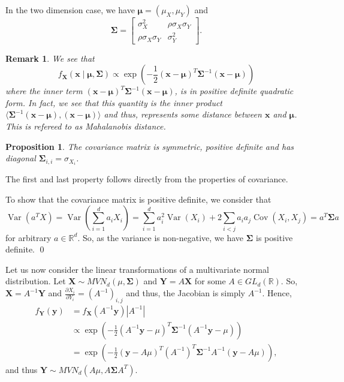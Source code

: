 \documentclass[
]{article}
\newtheorem{prop}{Proposition}[theorem]
\newtheorem*{remark}{Remark}
\theoremstyle{definition}
\begin{document}
In the two dimension case, we have \(\mathbf{\mu} = (\mu_X, \mu_Y)\) and
\[
  \mathbf{\Sigma} = 
  \begin{bmatrix}
    \sigma_X^2 & \rho \sigma_X \sigma_Y \\
    \rho \sigma_X \sigma_Y & \sigma_Y^2
  \end{bmatrix}.
\]

\begin{remark}
  We see that 
  \[
    f_\mathbf{X}(\mathbf{x} \mid \mathbf{\mu}, \mathbf{\Sigma}) \propto 
    \exp\left(-\frac{1}{2}(\mathbf{x} - \mathbf{\mu})^T \mathbf{\Sigma}^{-1}
    (\mathbf{x} - \mathbf{\mu})\right)
  \]
  where the inner term \((\mathbf{x} - \mathbf{\mu})^T \mathbf{\Sigma}^{-1}
  (\mathbf{x} - \mathbf{\mu})\), is in positive definite quadratic form. 
  In fact, we see that this quantity is the inner product 
  \(\langle \mathbf{\Sigma}^{-1} (\mathbf{x} - \mathbf{\mu}), 
  (\mathbf{x} - \mathbf{\mu}) \rangle\) and thus, represents some distance 
  between \(\mathbf{x}\) and \(\mathbf{\mu}\). This is refereed to as 
  Mahalanobis distance.
\end{remark}

\begin{prop}
  The covariance matrix is symmetric, positive definite and has diagonal 
  \(\mathbf{\Sigma}_{i, i} = \sigma_{X_i}\).
\end{prop}
\proof

The first and last property follows directly from the properties of
covariance.

To show that the covariance matrix is positive definite, we consider
that
\[\mathop{\mathrm{Var}}(a^T X) = \mathop{\mathrm{Var}}\left(\sum_{i = 1}^d a_i X_i\right) = 
    \sum_{i = 1}^d a_i^2 \mathop{\mathrm{Var}}(X_i) + 2 \sum_{i < j} a_i a_j \mathop{\mathrm{Cov}}(X_i, X_j)
    = a^T \mathbf{\Sigma}a \] for arbitrary \(a \in \mathbb{R}^d\). So,
as the variance is non-negative, we have \(\mathbf{\Sigma}\) is positive
definite. \qed

Let us now consider the linear transformations of a multivariate normal
distribution. Let \(\mathbf{X} \sim MVN_d(\mu, \mathbf{\Sigma})\) and
\(\mathbf{Y} = A \mathbf{X}\) for some \(A \in GL_d(\mathbb{R})\). So,
\(\mathbf{X} = A^{-1}\mathbf{Y}\) and
\(\frac{\partial{X_i}}{\partial{Y_i}} = (A^{-1})_{i, j}\) and thus, the
Jacobian is simply \(A^{-1}\). Hence, \begin{align*}
  f_\mathbf{Y}(\mathbf{y}) & = f_\mathbf{X}(A^{-1}\mathbf{y})\left|A^{-1}\right|\\
  & \propto \exp\left(-\frac{1}{2}(A^{-1}\mathbf{y} - \mu)^T 
    \mathbf{\Sigma}^{-1}(A^{-1}\mathbf{y} - \mu)\right)\\
  & = \exp\left(-\frac{1}{2}(\mathbf{y} - A\mu)^T (A^{-1})^T
    \mathbf{\Sigma}^{-1} A^{-1}(\mathbf{y} - A\mu)\right),
\end{align*} and thus
\(\mathbf{Y} \sim MVN_d(A\mu, A \mathbf{\Sigma}A^T)\).
\end{document}
